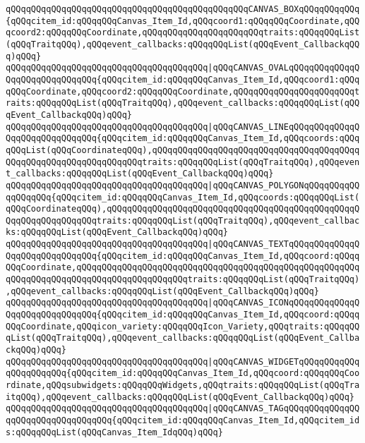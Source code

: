 \verb|qQQqqQQqqQQqqQQqqQQqqQQqqQQqqQQqqQQqqQQqqQQqqQQqCANVAS_BOXqQQqqQQqqQQq{qQQqcitem_id:qQQqqQQqCanvas_Item_Id,qQQqcoord1:qQQqqQQqCoordinate,qQQqcoord2:qQQqqQQqCoordinate,qQQqqQQqqQQqqQQqqQQqqQQqtraits:qQQqqQQqList(qQQqTraitqQQq),qQQqevent_callbacks:qQQqqQQqList(qQQqEvent_CallbackqQQq)qQQq}|\newline
\verb|qQQqqQQqqQQqqQQqqQQqqQQqqQQqqQQqqQQqqQQq|\verb#|qQQqCANVAS_OVALqQQqqQQqqQQqqQQqqQQqqQQqqQQqqQQq{qQQqcitem_id:qQQqqQQqCanvas_Item_Id,qQQqcoord1:qQQqqQQqCoordinate,qQQqcoord2:qQQqqQQqCoordinate,qQQqqQQqqQQqqQQqqQQqqQQqtraits:qQQqqQQqList(qQQqTraitqQQq),qQQqevent_callbacks:qQQqqQQqList(qQQqEvent_CallbackqQQq)qQQq}#\newline
\verb|qQQqqQQqqQQqqQQqqQQqqQQqqQQqqQQqqQQqqQQq|\verb#|qQQqCANVAS_LINEqQQqqQQqqQQqqQQqqQQqqQQqqQQqqQQq{qQQqcitem_id:qQQqqQQqCanvas_Item_Id,qQQqcoords:qQQqqQQqList(qQQqCoordinateqQQq),qQQqqQQqqQQqqQQqqQQqqQQqqQQqqQQqqQQqqQQqqQQqqQQqqQQqqQQqqQQqqQQqqQQqtraits:qQQqqQQqList(qQQqTraitqQQq),qQQqevent_callbacks:qQQqqQQqList(qQQqEvent_CallbackqQQq)qQQq}#\newline
\verb|qQQqqQQqqQQqqQQqqQQqqQQqqQQqqQQqqQQqqQQq|\verb#|qQQqCANVAS_POLYGONqQQqqQQqqQQqqQQqqQQq{qQQqcitem_id:qQQqqQQqCanvas_Item_Id,qQQqcoords:qQQqqQQqList(qQQqCoordinateqQQq),qQQqqQQqqQQqqQQqqQQqqQQqqQQqqQQqqQQqqQQqqQQqqQQqqQQqqQQqqQQqqQQqqQQqtraits:qQQqqQQqList(qQQqTraitqQQq),qQQqevent_callbacks:qQQqqQQqList(qQQqEvent_CallbackqQQq)qQQq}#\newline
\verb|qQQqqQQqqQQqqQQqqQQqqQQqqQQqqQQqqQQqqQQq|\verb#|qQQqCANVAS_TEXTqQQqqQQqqQQqqQQqqQQqqQQqqQQqqQQq{qQQqcitem_id:qQQqqQQqCanvas_Item_Id,qQQqcoord:qQQqqQQqCoordinate,qQQqqQQqqQQqqQQqqQQqqQQqqQQqqQQqqQQqqQQqqQQqqQQqqQQqqQQqqQQqqQQqqQQqqQQqqQQqqQQqqQQqqQQqqQQqtraits:qQQqqQQqList(qQQqTraitqQQq),qQQqevent_callbacks:qQQqqQQqList(qQQqEvent_CallbackqQQq)qQQq}#\newline
\verb|qQQqqQQqqQQqqQQqqQQqqQQqqQQqqQQqqQQqqQQq|\verb#|qQQqCANVAS_ICONqQQqqQQqqQQqqQQqqQQqqQQqqQQqqQQq{qQQqcitem_id:qQQqqQQqCanvas_Item_Id,qQQqcoord:qQQqqQQqCoordinate,qQQqicon_variety:qQQqqQQqIcon_Variety,qQQqtraits:qQQqqQQqList(qQQqTraitqQQq),qQQqevent_callbacks:qQQqqQQqList(qQQqEvent_CallbackqQQq)qQQq}#\newline
\verb|qQQqqQQqqQQqqQQqqQQqqQQqqQQqqQQqqQQqqQQq|\verb#|qQQqCANVAS_WIDGETqQQqqQQqqQQqqQQqqQQqqQQq{qQQqcitem_id:qQQqqQQqCanvas_Item_Id,qQQqcoord:qQQqqQQqCoordinate,qQQqsubwidgets:qQQqqQQqWidgets,qQQqtraits:qQQqqQQqList(qQQqTraitqQQq),qQQqevent_callbacks:qQQqqQQqList(qQQqEvent_CallbackqQQq)qQQq}#\newline
\verb|qQQqqQQqqQQqqQQqqQQqqQQqqQQqqQQqqQQqqQQq|\verb#|qQQqCANVAS_TAGqQQqqQQqqQQqqQQqqQQqqQQqqQQqqQQqqQQq{qQQqcitem_id:qQQqqQQqCanvas_Item_Id,qQQqcitem_ids:qQQqqQQqList(qQQqCanvas_Item_IdqQQq)qQQq}#\newline
